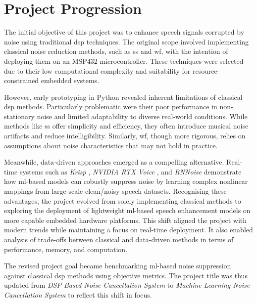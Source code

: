 \section{Project Progression}
\label{sec:project_progression}

The initial objective of this project was to enhance speech signals corrupted by noise using traditional \gls{dsp} techniques. The original scope involved implementing classical noise reduction methods, such as \gls{ss} and \gls{wf}, with the intention of deploying them on an MSP432 microcontroller. These techniques were selected due to their low computational complexity and suitability for resource-constrained embedded systems.

However, early prototyping in Python revealed inherent limitations of classical \gls{dsp} methods. Particularly problematic were their poor performance in non-stationary noise and limited adaptability to diverse real-world conditions. While methods like \gls{ss} offer simplicity and efficiency, they often introduce musical noise artifacts and reduce intelligibility. Similarly, \gls{wf}, though more rigorous, relies on assumptions about noise characteristics that may not hold in practice.

Meanwhile, data-driven approaches emerged as a compelling alternative. Real-time systems such as \textit{Krisp} \cite{krisp2025}, \textit{NVIDIA RTX Voice} \cite{nvidia2020}, and \textit{RNNoise} \cite{valin2018} demonstrate how \gls{ml}-based models can robustly suppress noise by learning complex nonlinear mappings from large-scale clean/noisy speech datasets. Recognising these advantages, the project evolved from solely implementing classical methods to exploring the deployment of lightweight \gls{ml}-based speech enhancement models on more capable embedded hardware platforms. This shift aligned the project with modern trends while maintaining a focus on real-time deployment. It also enabled analysis of trade-offs between classical and data-driven methods in terms of performance, memory, and computation.

The revised project goal became benchmarking \gls{ml}-based noise suppression against classical \gls{dsp} methods using objective metrics. The project title was thus updated from \textit{DSP Based Noise Cancellation System} to \textit{Machine Learning Noise Cancellation System} to reflect this shift in focus.